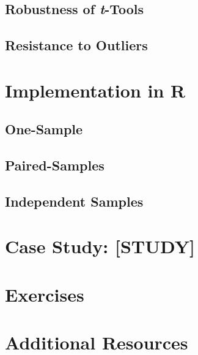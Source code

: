 \subsection{Robustness of \textit{t}-Tools}

\subsection{Resistance to Outliers}

\section{Implementation in R}

\subsection{One-Sample}

\subsection{Paired-Samples}

\subsection{Independent Samples}

\section{Case Study: [STUDY]}

\section{Exercises}

\section{Additional Resources}
